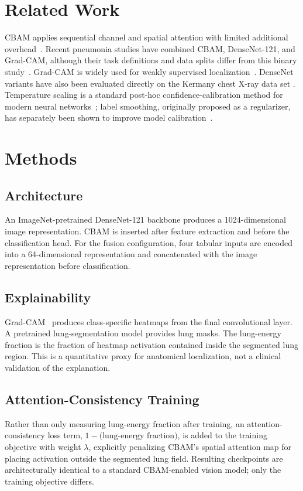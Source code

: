 \documentclass[11pt,a4paper]{article}
\begin{document}
\section{Related Work}
CBAM applies sequential channel and spatial attention with limited additional
overhead~\cite{woo2018cbam}. Recent pneumonia studies have combined CBAM,
DenseNet-121, and Grad-CAM, although their task definitions and data splits
differ from this binary study~\cite{dey2026cbam,potharaju2025enhanced,
rashid2025framework}. Grad-CAM is widely used for weakly supervised
localization~\cite{selvaraju2017gradcam,shahi2025weakly}. DenseNet variants
have also been evaluated directly on the Kermany chest X-ray data set
\cite{bundea2024pneumonia,erukude2025explainable}. Temperature scaling is a
standard post-hoc confidence-calibration method for modern neural
networks~\cite{guo2017calibration}; label smoothing, originally proposed as
a regularizer, has separately been shown to improve model
calibration~\cite{muller2019labelsmoothing}.

\section{Methods}
\subsection{Architecture}
An ImageNet-pretrained DenseNet-121 backbone produces a 1024-dimensional image
representation. CBAM is inserted after feature extraction and before the
classification head. For the fusion configuration, four tabular inputs are
encoded into a 64-dimensional representation and concatenated with the image
representation before classification.

\subsection{Explainability}
Grad-CAM~\cite{selvaraju2017gradcam} produces class-specific heatmaps from the
final convolutional layer. A pretrained lung-segmentation model provides lung
masks. The lung-energy fraction is the fraction of heatmap activation contained
inside the segmented lung region. This is a quantitative proxy for anatomical
localization, not a clinical validation of the explanation.

\subsection{Attention-Consistency Training}
Rather than only measuring lung-energy fraction after training, an
attention-consistency loss term, $1 - \text{(lung-energy fraction)}$, is
added to the training objective with weight $\lambda$, explicitly penalizing
CBAM's spatial attention map for placing activation outside the segmented
lung field. Resulting checkpoints are architecturally identical to a
standard CBAM-enabled vision model; only the training objective differs.
\end{document}
